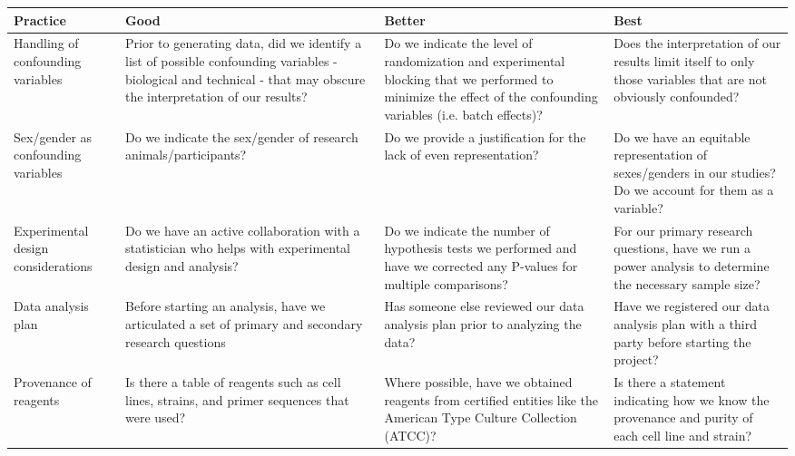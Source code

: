 \documentclass[]{article}
\begin{document}
\begin{center}
    \scriptsize{}
    \renewcommand{\arraystretch}{1.8}
  \begin{tabular}{ | P{3cm} | P{4cm} | P{4cm} | P{4cm} |}
  \hline
    \textbf{Practice} & \textbf{Good} & \textbf{Better} & \textbf{Best} \\ \hline
    Handling of confounding variables
    & Prior to generating data, did we identify a list of possible confounding variables - biological and technical - that may obscure the interpretation of our results?
    & Do we indicate the level of randomization and experimental blocking that we performed to minimize the effect of the confounding variables (i.e. batch effects)?
    & Does the interpretation of our results limit itself to only those variables that are not obviously confounded? \\ \hline

    Sex/gender as confounding variables
    & Do we indicate the sex/gender of research animals/participants?
    & Do we provide a justification for the lack of even representation?
    & Do we have an equitable representation of sexes/genders in our studies? Do we account for them as a variable? \\ \hline

    Experimental design considerations
    & Do we have an active collaboration with a statistician who helps with experimental design and analysis?
    & Do we indicate the number of hypothesis tests we performed and have we corrected any P-values for multiple comparisons?
    & For our primary research questions, have we run a power analysis to determine the necessary sample size? \\ \hline

    Data analysis plan
    & Before starting an analysis, have we articulated a set of primary and secondary research questions
    & Has someone else reviewed our data analysis plan prior to analyzing the data?
    & Have we registered our data analysis plan with a third party before starting the project? \\ \hline

    Provenance of reagents
    & Is there a table of reagents such as cell lines, strains, and primer sequences that were used?
    & Where possible, have we obtained reagents from certified entities like the American Type Culture Collection (ATCC)?
    & Is there a statement indicating how we know the provenance and purity of each cell line and strain? \\ \hline


\end{tabular}
\end{center}
\end{document}

